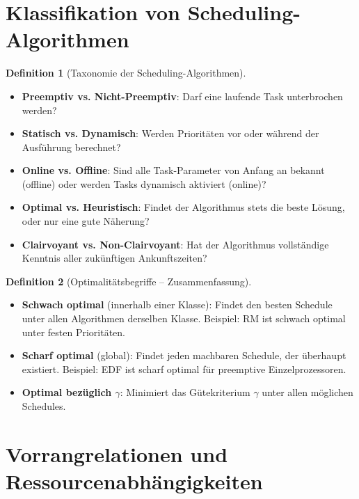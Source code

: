 ﻿\documentclass[a4paper,12pt]{report}
\theoremstyle{definition}
\newtheorem{definition}{Definition}[chapter]
\begin{document}
\section{Klassifikation von Scheduling-Algorithmen}

\begin{definition}[Taxonomie der Scheduling-Algorithmen]
	\begin{itemize}
		\item \textbf{Preemptiv vs. Nicht-Preemptiv}: Darf eine laufende Task
		      unterbrochen werden?
		\item \textbf{Statisch vs. Dynamisch}: Werden Prioritäten vor oder
		      während der Ausführung berechnet?
		\item \textbf{Online vs. Offline}: Sind alle Task-Parameter von Anfang
		      an bekannt (offline) oder werden Tasks dynamisch aktiviert (online)?
		\item \textbf{Optimal vs. Heuristisch}: Findet der Algorithmus stets
		      die beste Lösung, oder nur eine gute Näherung?
		\item \textbf{Clairvoyant vs. Non-Clairvoyant}: Hat der Algorithmus
		      vollständige Kenntnis aller zukünftigen Ankunftszeiten?
	\end{itemize}
\end{definition}

\begin{definition}[Optimalitätsbegriffe -- Zusammenfassung]
	\label{def:optimalitaet}
	\begin{itemize}
		\item \textbf{Schwach optimal} (innerhalb einer Klasse): Findet den
		      besten Schedule unter allen Algorithmen derselben Klasse.
		      Beispiel: RM ist schwach optimal unter festen Prioritäten.
		\item \textbf{Scharf optimal} (global): Findet jeden machbaren Schedule,
		      der überhaupt existiert. Beispiel: EDF ist scharf optimal für
		      preemptive Einzelprozessoren.
		\item \textbf{Optimal bezüglich $\gamma$}: Minimiert das Gütekriterium
		      $\gamma$ unter allen möglichen Schedules.
	\end{itemize}
\end{definition}

\section{Vorrangrelationen und Ressourcenabhängigkeiten}
\end{document}
